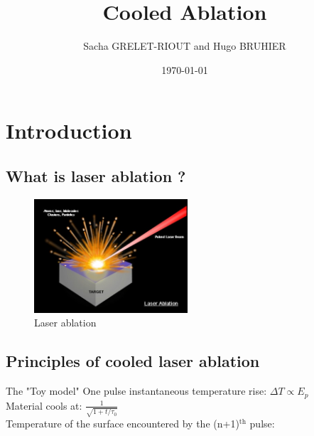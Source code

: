 \documentclass[11pt]{beamer}
\author{Sacha GRELET-RIOUT and Hugo BRUHIER}
\title{Cooled Ablation}
\institute{Télécom Saint-Étienne}
\date{\today}
\begin{document}

\begin{frame}
\titlepage
\end{frame}

\begin{frame}
\tableofcontents
\end{frame}

\section{Introduction}
\subsection{What is laser ablation ?}
\begin{frame}

\begin{figure}[H]
\centering
\includegraphics[height=160px]{laser_ablation.jpg}
\caption{Laser ablation}
\end{figure}

\end{frame}

\subsection{Principles of cooled laser ablation}
\begin{frame}{The "Toy model"}
One pulse instantaneous temperature rise:
$
\Delta T \propto E_p
$
\\
\vspace{15px}
Material cools at:
$
\frac{1}{\sqrt{1+t/\tau_0}}
$
\\
\vspace{15px}
Temperature of the surface encountered by the (n+1)$^\text{th}$ pulse:

\end{frame}
\end{document}
